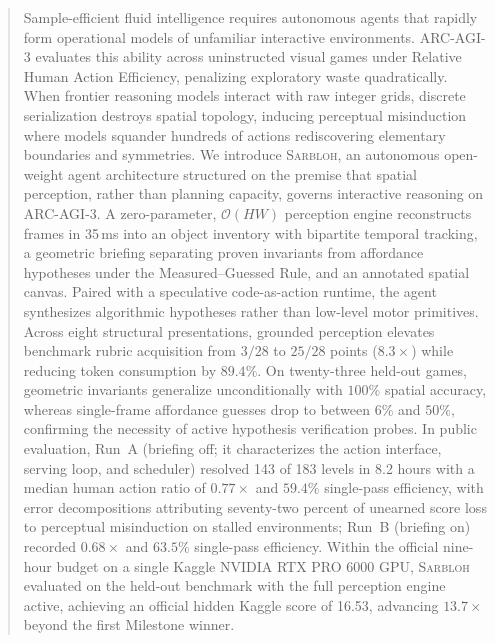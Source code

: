 \begin{abstract}
\begin{tintbox}
Sample-efficient fluid intelligence requires autonomous agents that rapidly form operational models of unfamiliar interactive environments. ARC-AGI-3 evaluates this ability across uninstructed visual games under Relative Human Action Efficiency, penalizing exploratory waste quadratically. When frontier reasoning models interact with raw integer grids, discrete serialization destroys spatial topology, inducing perceptual misinduction where models squander hundreds of actions rediscovering elementary boundaries and symmetries. We introduce \textsc{Sarbloh}, an autonomous open-weight agent architecture structured on the premise that spatial perception, rather than planning capacity, governs interactive reasoning on ARC-AGI-3. A zero-parameter, $\mathcal{O}(HW)$ perception engine reconstructs frames in 35\,ms into an object inventory with bipartite temporal tracking, a geometric briefing separating proven invariants from affordance hypotheses under the Measured--Guessed Rule, and an annotated spatial canvas. Paired with a speculative code-as-action runtime, the agent synthesizes algorithmic hypotheses rather than low-level motor primitives. Across eight structural presentations, grounded perception elevates benchmark rubric acquisition from $3/28$ to $25/28$ points ($8.3\times$) while reducing token consumption by $89.4\%$. On twenty-three held-out games, geometric invariants generalize unconditionally with $100\%$ spatial accuracy, whereas single-frame affordance guesses drop to between $6\%$ and $50\%$, confirming the necessity of active hypothesis verification probes. In public evaluation, Run~A (briefing off; it characterizes the action interface, serving loop, and scheduler) resolved 143 of 183 levels in 8.2 hours with a median human action ratio of $0.77\times$ and $59.4\%$ single-pass efficiency, with error decompositions attributing seventy-two percent of unearned score loss to perceptual misinduction on stalled environments; Run~B (briefing on) recorded $0.68\times$ and $63.5\%$ single-pass efficiency. Within the official nine-hour budget on a single Kaggle NVIDIA RTX PRO 6000 GPU, \textsc{Sarbloh} evaluated on the held-out benchmark with the full perception engine active, achieving an official hidden Kaggle score of 16.53, advancing $13.7\times$ beyond the first Milestone winner.
\end{tintbox}
\end{abstract}
